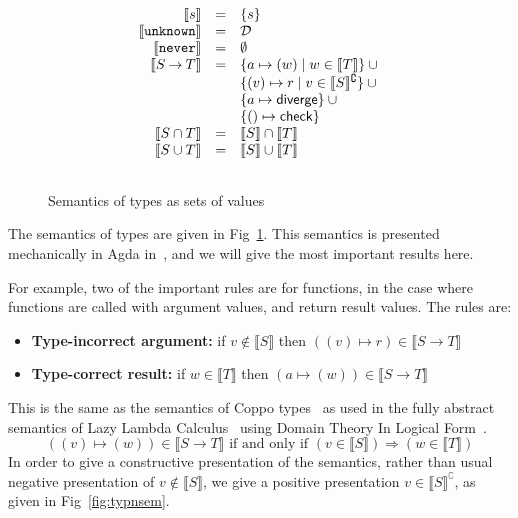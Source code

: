 \documentclass[acmsmall,review,screen]{acmart}
\newcommand{\NEVER}{\mathtt{never}}
\newcommand{\UNKNOWN}{\mathtt{unknown}}
\newcommand{\DIVERGE}{\mathsf{diverge}}
\newcommand{\CHECK}{\mathsf{check}}
\newcommand{\fun}{\mathbin{\rightarrow}}
\newcommand{\sem}[1]{\llbracket{#1}\rrbracket}
\newcommand{\nsem}[1]{\llbracket{#1}\rrbracket^\complement}
\begin{document}
\begin{figure}
  
\[\begin{array}{rcl}
  \sem{s} & = & \{ s \} \\
  \sem{\UNKNOWN} & = & \mathcal{D} \\
  \sem{\NEVER} & = & \emptyset \\
  \sem{S \fun T} & = & \{ a \mapsto (w) \mid w \in \sem{T} \} \cup {} \\
                    && \{ (v) \mapsto r \mid v \in \nsem{S} \} \cup {} \\
                    && \{ a \mapsto \DIVERGE \} \cup {} \\
                    && \{ () \mapsto \CHECK \} \\
  \sem{S \cap T} & = & \sem{S} \cap \sem{T} \\
  \sem{S \cup T} & = & \sem{S} \cup \sem{T} \\[\bigskipamount]
\end{array}\]
\caption{Semantics of types as sets of values}
\label{fig:typsem}

\end{figure}

The semantics of  types are given in Fig~\ref{fig:typsem}.
This semantics is presented mechanically in Agda in~,
and we will give the most important results here.

For example, two of the important rules are for functions, in the case where
functions are called with argument values, and return result values.
The rules are:

\begin{itemize}
\item
  \textbf{Type-incorrect argument:}
  if $v \not\in \sem{S}$
  then $((v) \mapsto r) \in \sem{S \fun T}$
\item
  \textbf{Type-correct result:}
  if $w \in \sem{T}$
  then $(a \mapsto (w)) \in \sem{S \fun T}$
\end{itemize}
This is the same as the semantics of Coppo types~\cite{???}
as used in the fully abstract semantics of Lazy Lambda Calculus~\cite{???}
using Domain Theory In Logical Form~\cite{???}.
\[
  ((v) \mapsto (w)) \in \sem{S \fun T} \mbox{ if and only if }
  (v \in \sem{S}) \Rightarrow (w \in \sem{T})
\]
In order to give a constructive presentation of the semantics,
rather than usual negative presentation of $v \not\in \sem{S}$,
we give a positive presentation $v \in \nsem{S}$, as given in
Fig~\ref{fig:typnsem}.
\end{document}
